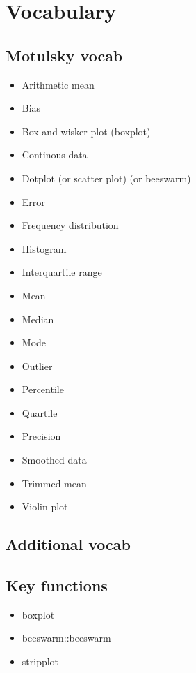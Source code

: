 \documentclass[]{book}
\providecommand{\tightlist}{%
  \setlength{\itemsep}{0pt}\setlength{\parskip}{0pt}}
\theoremstyle{definition}
\theoremstyle{definition}
\theoremstyle{definition}
\theoremstyle{remark}
\begin{document}
\section*{Vocabulary}\label{vocabulary-3}

\subsection*{Motulsky vocab}\label{motulsky-vocab-3}

\begin{itemize}
\tightlist
\item
  Arithmetic mean
\item
  Bias
\item
  Box-and-wisker plot (boxplot)
\item
  Continous data
\item
  Dotplot (or scatter plot) (or beeswarm)
\item
  Error
\item
  Frequency distribution
\item
  Histogram
\item
  Interquartile range
\item
  Mean
\item
  Median
\item
  Mode
\item
  Outlier
\item
  Percentile
\item
  Quartile
\item
  Precision
\item
  Smoothed data
\item
  Trimmed mean
\item
  Violin plot
\end{itemize}

\subsection*{Additional vocab}\label{additional-vocab-2}

\subsection*{Key functions}\label{key-functions-2}

\begin{itemize}
\tightlist
\item
  boxplot
\item
  beeswarm::beeswarm
\item
  stripplot
\end{itemize}
\end{document}
